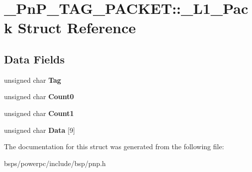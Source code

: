\hypertarget{struct__PnP__TAG__PACKET_1_1__L1__Pack}{}\section{\+\_\+\+Pn\+P\+\_\+\+T\+A\+G\+\_\+\+P\+A\+C\+K\+ET\+::\+\_\+\+L1\+\_\+\+Pack Struct Reference}
\label{struct__PnP__TAG__PACKET_1_1__L1__Pack}
\subsection*{Data Fields}
\begin{DoxyCompactItemize}
\item 
\mbox{\label{struct__PnP__TAG__PACKET_1_1__L1__Pack_a14a895ab524050e1e9614a1c461c2985}} 
unsigned char {\bfseries Tag}
\item 
\mbox{\label{struct__PnP__TAG__PACKET_1_1__L1__Pack_a8d8a089d8e7defa0196265c424f6a13f}} 
unsigned char {\bfseries Count0}
\item 
\mbox{\label{struct__PnP__TAG__PACKET_1_1__L1__Pack_ad4bb18318079e528ccc106e6ce7374f4}} 
unsigned char {\bfseries Count1}
\item 
\mbox{\label{struct__PnP__TAG__PACKET_1_1__L1__Pack_a71ac2a393828439d406d0d130ccd7874}} 
unsigned char {\bfseries Data} \mbox{[}9\mbox{]}
\end{DoxyCompactItemize}


The documentation for this struct was generated from the following file\+:\begin{DoxyCompactItemize}
\item 
bsps/powerpc/include/bsp/pnp.\+h\end{DoxyCompactItemize}
